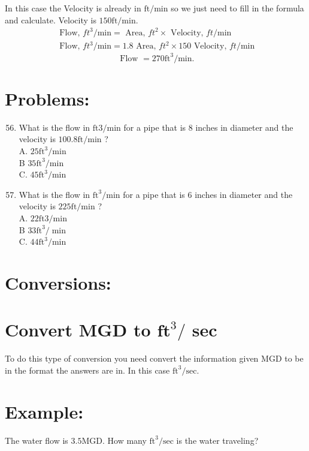 \begin{enumerate}
In this case the Velocity is already in $\mathrm{ft} / \mathrm{min}$ so we just need to fill in the formula and calculate. Velocity is $150 \mathrm{ft} / \mathrm{min}$.
$$
\begin{gathered}
\text { Flow, } f t^{3} / \mathrm{min}=\text { Area, } f t^{2} \times \text { Velocity, } f t / \mathrm{min} \\
\text { Flow, } f t^{3} / \mathrm{min}=1.8 \text { Area, } f t^{2} \times 150 \text { Velocity, } f t / \mathrm{min}
\end{gathered}
$$
$$
\text { Flow }=270 \mathrm{ft}^{3} / \mathrm{min} .
$$

\section{Problems:}
\begin{enumerate}
  \setcounter{enumi}{55}
  \item What is the flow in $\mathrm{ft} 3 / \mathrm{min}$ for a pipe that is 8 inches in diameter and the velocity is $100.8 \mathrm{ft} / \mathrm{min}$ ?\\
A. $25 \mathrm{ft}^{3} / \mathrm{min}$\\
B $35 \mathrm{ft}^{3} / \mathrm{min}$\\
C. $45 \mathrm{ft}^{3} / \mathrm{min}$

  \item What is the flow in $\mathrm{ft}^{3} / \mathrm{min}$ for a pipe that is 6 inches in diameter and the velocity is $225 \mathrm{ft} / \mathrm{min}$ ?\\
A. $22 \mathrm{ft} 3 / \mathrm{min}$\\
B $33 \mathrm{ft}^{3} / \min$\\
C. $44 \mathrm{ft}^{3} / \mathrm{min}$

\end{enumerate}
\section{Conversions:}
\section{Convert MGD to $\mathbf{f t}^{3} /$ sec}
To do this type of conversion you need convert the information given MGD to be in the format the answers are in. In this case $\mathrm{ft}^{3} / \mathrm{sec}$.

\section{Example:}
The water flow is $3.5 \mathrm{MGD}$. How many $\mathrm{ft}^{3} / \mathrm{sec}$ is the water traveling?


\end{enumerate}
